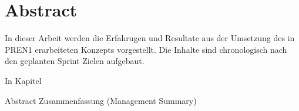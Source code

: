 \section*{Abstract}

In dieser Arbeit werden die Erfahrugen und Resultate aus der Umsetzung des in PREN1 erarbeiteten Konzepts vorgestellt. Die Inhalte sind chronologisch nach den geplanten Sprint Zielen aufgebaut. 

In Kapitel

Abstract
Zusammenfassung (Management Summary)